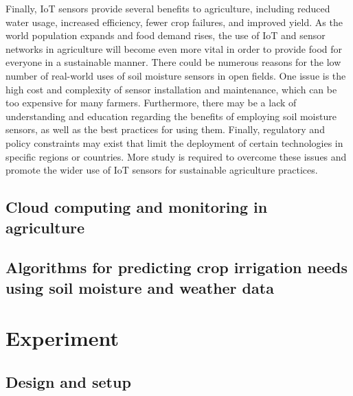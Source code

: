 \documentclass[11pt]{scrartcl} %
\begin{document}
\newline Finally, IoT sensors provide several benefits to agriculture, including reduced water usage, increased efficiency, fewer crop failures, and improved yield. As the world population expands and food demand rises, the use of IoT and sensor networks in agriculture will become even more vital in order to provide food for everyone in a sustainable manner.\parencite{capacitive_sensors_for_irrigation_and_disease,bwambale2022smart}
\newline There could be numerous reasons for the low number of real-world uses of soil moisture sensors in open fields. One issue is the high cost and complexity of sensor installation and maintenance, which can be too expensive for many farmers. Furthermore, there may be a lack of understanding and education regarding the benefits of employing soil moisture sensors, as well as the best practices for using them. Finally, regulatory and policy constraints may exist that limit the deployment of certain technologies in specific regions or countries. More study is required to overcome these issues and promote the wider use of IoT sensors for sustainable agriculture practices.


\subsection{Cloud computing and monitoring in agriculture}
\subsection{Algorithms for predicting crop irrigation needs using soil moisture and weather data}
\section{Experiment}
\subsection{Design and setup}
\end{document}
